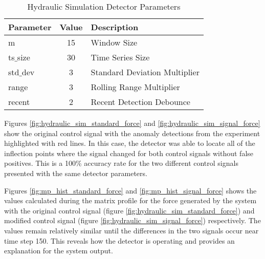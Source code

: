 \begin{table}[H]
\begin{tabular}{|l|c|l|}
    \hline
	\textbf{Parameter} & \textbf{Value} & \textbf{Description} \\ \hline
	m & 15 & Window Size \\ \hline
	ts$\_$size & 30 & Time Series Size \\ \hline
	std$\_$dev & 3 & Standard Deviation Multiplier \\ \hline
	range & 3 & Rolling Range Multiplier\\ \hline
	recent & 2 & Recent Detection Debounce\\ \hline
\end{tabular}
\caption{Hydraulic Simulation Detector Parameters}
\label{tab:hydraulic_sim_params}
\end{table}

Figures \ref{fig:hydraulic_sim_standard_force} and \ref{fig:hydraulic_sim_signal_force} show the original control signal with the anomaly detections from the experiment highlighted with red lines. In this case, the detector was able to locate all of the inflection points where the signal changed for both control signals without false positives. This is a 100\% accuracy rate for the two different control signals presented with the same detector parameters.


Figures \ref{fig:mp_hist_standard_force} and \ref{fig:mp_hist_signal_force} shows the values calculated during the matrix profile for the force generated by the system with the original control signal (figure \ref{fig:hydraulic_sim_standard_force}) and modified control signal (figure \ref{fig:hydraulic_sim_signal_force}) respectively. The values remain relatively similar until the differences in the two signals occur near time step 150. This reveals how the detector is operating and provides an explanation for the system output. 

